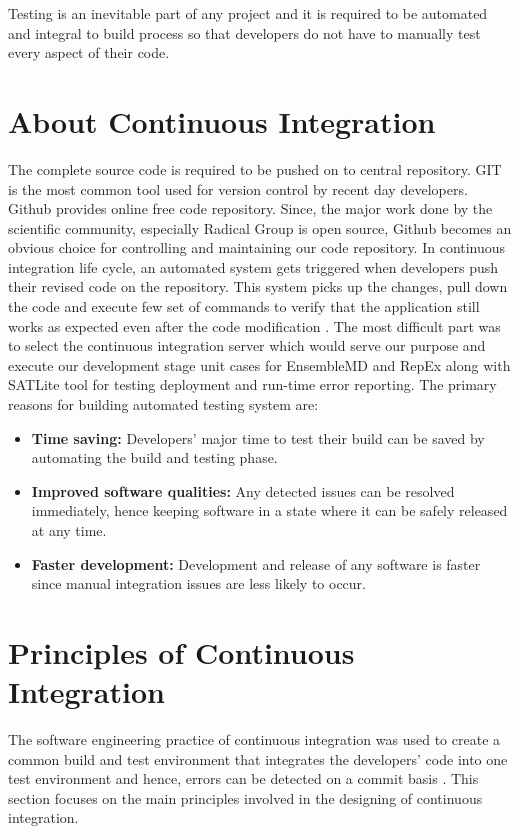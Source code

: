 \documentclass[10pt]{ruthesis}
\begin{document}
Testing is an inevitable part of any project and it is required to be automated and integral to build process so that developers do not have to manually test every aspect of their code. 

\section{About Continuous Integration}
The complete source code is required to be pushed on to central repository. GIT is the most common tool used for version control by recent day developers. Github provides online free code repository. Since, the major work done by the scientific community, especially Radical Group is open source, Github becomes an obvious choice for controlling and maintaining our code repository. In continuous integration life cycle, an automated system gets triggered when developers push their revised code on the repository. This system picks up the changes, pull down the code and execute few set of commands to verify that the application still works as expected even after the code modification \cite{ref17}. The most difficult part was to select the continuous integration server which would serve our purpose and execute our development stage unit cases for EnsembleMD and RepEx along with SATLite tool for testing deployment and run-time error reporting. The primary reasons for building automated testing system are: 

\begin{itemize}
\item \textbf{Time saving:} Developers' major time to test their build can be saved by automating the build and testing phase. 

\item \textbf{Improved software qualities:} Any detected issues can be resolved immediately, hence keeping software in a state where it can be safely released at any time.

\item \textbf{Faster development:} Development and release of any software is faster since manual integration issues are less likely to occur.
\end{itemize}


\section{Principles of Continuous Integration}

The software engineering practice of continuous integration was used to create a common build and test environment that integrates the developers’ code into one test environment and hence, errors can be detected on a commit basis \cite{ref26}. This section focuses on the main principles involved in the designing of continuous integration.
\end{document}
